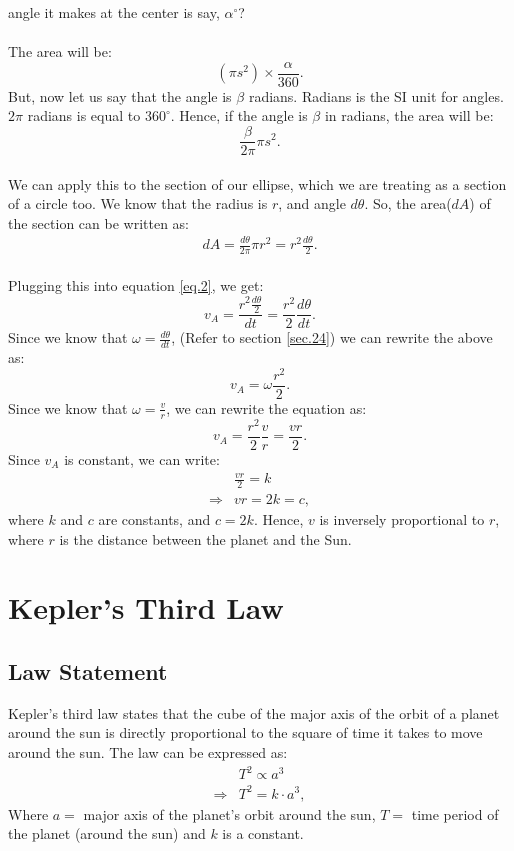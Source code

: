 \documentclass[a4paper]{report}
\begin{document}
angle it makes at the center is say, $\alpha^{\circ}$? \\\\
The area will be: $$(\pi s^2)\times \frac{\alpha}{360}.$$
But, now let us say that the angle is $\beta$ radians. Radians is the SI unit for angles. $2\pi$ radians is 
equal to $360^{\circ}.$ Hence, if the angle is $\beta$ in radians, the area will be: 
$$\frac{\beta}{2\pi}\pi s^2.$$
\\
We can apply this to the section of our ellipse, which we are treating as a section of a circle too. 
We know that the radius is $r$, and angle $d\theta$. So, the area($dA$) of the section can be written as:
\begin{align}\label{eq.3}
  dA=\frac{d\theta}{2\pi}\pi r^2=r^2\frac{d\theta}{2}.
\end{align}
\\
Plugging this into equation \ref{eq.2}, we get: 
$$v_A=\frac{r^2\frac{d\theta}{2}}{dt}=\frac{r^2}{2}\frac{d\theta}{dt}.$$
Since we know that $\omega=\frac{d\theta}{dt}$, (Refer to section \ref{sec.24}) we can rewrite the above as: 
$$v_A=\omega\frac{r^2}{2}.$$
Since we know that $\omega=\frac{v}{r}$, we can rewrite the equation as:
$$v_A=\frac{r^2}{2}\frac{v}{r}=\frac{vr}{2}.$$
Since $v_A$ is constant, we can write:
\begin{align*}
  &\frac{vr}{2}=k\\
  \Rightarrow &\boxed{vr=2k=c},
\end{align*}
where $k$ and $c$ are constants, and $c=2k.$
Hence, $v$ is inversely proportional to $r$, where $r$ is the distance between the planet and the Sun.

\section{Kepler's Third Law} \label{sec.12}
\subsection{Law Statement}
Kepler's third law states that the cube of the major axis of the orbit of a planet around the sun is directly 
proportional to the square of time it takes to move around the sun. The law can be expressed as: 
\begin{align*}
  &T^2\propto a^3\\
  \Rightarrow &T^2 = k\cdot a^3,
\end{align*}
Where $a =$ major axis of the planet's orbit around the sun, $T =$ time period of the planet (around the sun)
and $k$ is a constant.\\
\end{document}
